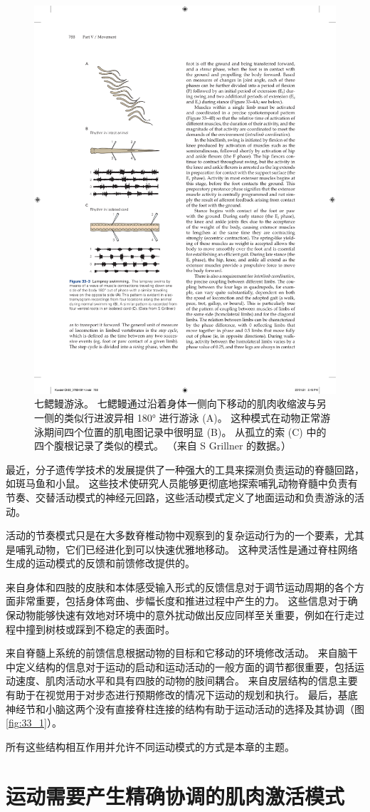 \begin{figure}[htbp]
	\centering
	\includegraphics[width=0.4\linewidth]{chap33/fig_33_3}
	\caption{七鳃鳗游泳。 七鳃鳗通过沿着身体一侧向下移动的肌肉收缩波与另一侧的类似行进波异相 180° 进行游泳 (A)。 这种模式在动物正常游泳期间四个位置的肌电图记录中很明显 (B)。 从孤立的索 (C) 中的四个腹根记录了类似的模式。 （来自 S Grillner 的数据。）}
	\label{fig:33_3}
\end{figure}

最近，分子遗传学技术的发展提供了一种强大的工具来探测负责运动的脊髓回路，如斑马鱼和小鼠。
这些技术使研究人员能够更彻底地探索哺乳动物脊髓中负责有节奏、交替活动模式的神经元回路，这些活动模式定义了地面运动和负责游泳的活动。


活动的节奏模式只是在大多数脊椎动物中观察到的复杂运动行为的一个要素，尤其是哺乳动物，它们已经进化到可以快速优雅地移动。
这种灵活性是通过脊柱网络生成的运动模式的反馈和前馈修改提供的。


来自身体和四肢的皮肤和本体感受输入形式的反馈信息对于调节运动周期的各个方面非常重要，包括身体弯曲、步幅长度和推进过程中产生的力。
这些信息对于确保动物能够快速有效地对环境中的意外扰动做出反应同样至关重要，例如在行走过程中撞到树枝或踩到不稳定的表面时。


来自脊髓上系统的前馈信息根据动物的目标和它移动的环境修改活动。
来自脑干中定义结构的信息对于运动的启动和运动活动的一般方面的调节都很重要，包括运动速度、肌肉活动水平和具有四肢的动物的肢间耦合。
来自皮层结构的信息主要有助于在视觉用于对步态进行预期修改的情况下运动的规划和执行。
最后，基底神经节和小脑这两个没有直接脊柱连接的结构有助于运动活动的选择及其协调（图 \ref{fig:33_1}）。


所有这些结构相互作用并允许不同运动模式的方式是本章的主题。



\section{运动需要产生精确协调的肌肉激活模式}

